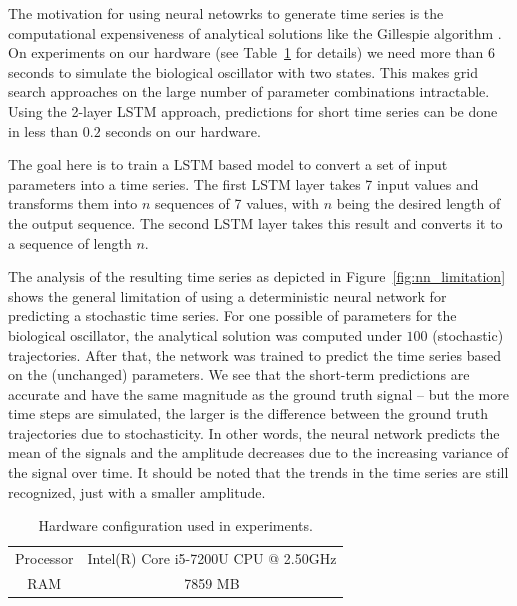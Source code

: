 \documentclass{article}
\begin{document}
The motivation for using neural netowrks to generate time series is the 
computational expensiveness of analytical solutions like the Gillespie 
algorithm \cite{gillespie1977}. On experiments on our hardware 
(see Table~\ref{tab:hardware} for details) 
we need more than 6 seconds to simulate the biological oscillator with two
states. This makes grid search approaches on the large number of parameter 
combinations intractable. Using the 2-layer LSTM approach, predictions for 
short time series can be done in less than $0.2$ seconds on our hardware.

The goal here is to train a LSTM based 
model to convert a set of input parameters into a time series. The first 
LSTM layer
takes 7 input values and transforms them into $n$ sequences of 7 values, with 
$n$ being the desired length of the output sequence. The second LSTM layer 
takes this result and converts it to a sequence of length $n$. 

The analysis of the resulting time series as depicted in 
Figure~\ref{fig:nn_limitation} shows the general limitation of using a
deterministic neural network for predicting a stochastic time series. For one 
possible of parameters for the biological oscillator, the analytical solution 
was computed under $100$ (stochastic) trajectories. After that, the network was 
trained to predict the time series based on the (unchanged) parameters. We see 
that the short-term predictions are accurate and have the same magnitude as the
ground truth signal -- but the more time steps are simulated, the larger is the
difference between the ground truth trajectories due to stochasticity. In other
words, the neural network predicts the mean of the signals and the amplitude
decreases due to the increasing variance of the signal over time.
It should be noted that the trends in the time series are still 
recognized, just with a smaller amplitude.

\begin{table}
  \centering
  \begin{tabular}{cc}
    Processor & Intel(R) Core i5-7200U CPU @ 2.50GHz \\
    RAM & 7859 MB \\
  \end{tabular}
  \caption{Hardware configuration used in experiments.}
  \label{tab:hardware}
\end{table}
\end{document}
